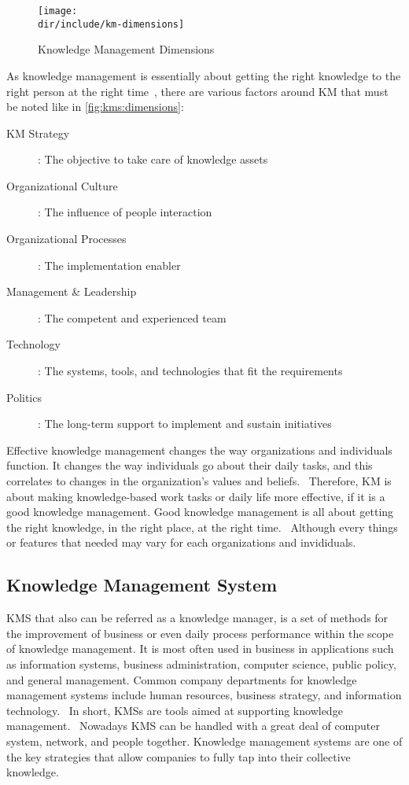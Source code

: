 \begin{figure}[htbp]
    \centering
    \texttt{[image: \\dir/include/km-dimensions]}
    \caption{Knowledge Management Dimensions}
    \label{fig:kms:dimensions}
\end{figure}

As knowledge management is essentially about getting the right knowledge to the right person at the right time~\autocite{Frost2010KM}, there are various factors around \ac{KM} that must be noted like in \autoref{fig:kms:dimensions}:

\begin{description}
  \item [KM Strategy]: The objective to take care of knowledge assets
  \item [Organizational Culture]: The influence of people interaction
  \item [Organizational Processes]: The implementation enabler
  \item [Management \& Leadership]: The competent and experienced team
  \item [Technology]: The systems, tools, and technologies that fit the requirements
  \item [Politics]: The long-term support to implement and sustain initiatives
\end{description}

Effective knowledge management changes the way organizations and individuals function.
It changes the way individuals go about their daily tasks, and this correlates to changes in the organization’s values and beliefs.~\autocite{Call2005KM}
Therefore, \ac{KM} is about making knowledge-based work tasks or daily life more effective, if it is a good knowledge management.
Good knowledge management is all about getting the right knowledge, in the right place, at the right time.~\autocite{Brun:2015:ABCKM:6}
Although every things or features that needed may vary for each organizations and invididuals.

\subsection{Knowledge Management System}

\ac{KMS} that also can be referred as a knowledge manager, is a set of methods for the improvement of business or even daily process performance within the scope of knowledge management.
It is most often used in business in applications such as information systems, business administration, computer science, public policy, and general management.
Common company departments for knowledge management systems include human resources, business strategy, and information technology.~\autocite{BD2015KMS}
In short, \ac{KMS}s are tools aimed at supporting knowledge management.~\autocite{Dalkir2005KM}
Nowadays \ac{KMS} can be handled with a great deal of computer system, network, and people together.
Knowledge management systems are one of the key strategies that allow companies to fully tap into their collective knowledge.~\autocite{Panela2011mikrow}

